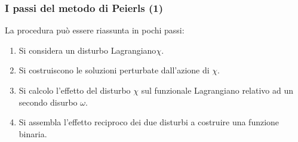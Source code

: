 \documentclass[8pt,handout]{beamer}
\begin{document}
	\begin{frame}
		\frametitle{I passi del metodo di Peierls (1)}	
			La procedura può essere riassunta in pochi passi:
		\begin{enumerate}
			\item Si considera un disturbo Lagrangiano$\chi$. 
			\item Si costruiscono le soluzioni perturbate dall'azione di $\chi$.
			\item Si calcolo l'effetto del disturbo $\chi$ sul funzionale Lagrangiano relativo ad un secondo disurbo $\omega$.
			\item Si assembla l'effetto reciproco dei due disturbi a costruire una funzione binaria.
		\end{enumerate}	
	\end{frame}
\end{document}
